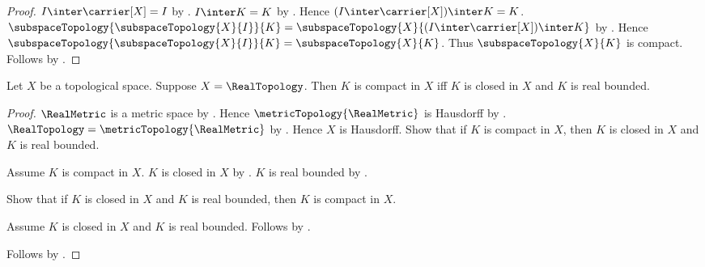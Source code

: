 \begin{proof}
    $I\inter\carrier[X]=I$ by
        .
    $I\inter K=K$ by
        .
    Hence $(I\inter\carrier[X])\inter K=K$.
    $\subspaceTopology{\subspaceTopology{X}{I}}{K}
        =\subspaceTopology{X}{(I\inter\carrier[X])\inter K}$ by
        .
    Hence $\subspaceTopology{\subspaceTopology{X}{I}}{K}
        =\subspaceTopology{X}{K}$.
    Thus $\subspaceTopology{X}{K}$ is compact.
    Follows by .
\end{proof}

\begin{theorem}\label{real_heine_borel}
    Let $X$ be a topological space.
    Suppose $X=\RealTopology$.
    Then $K$ is compact in $X$ iff
        $K$ is closed in $X$ and $K$ is real bounded.
\end{theorem}
\begin{proof}
    $\RealMetric$ is a metric space by
        .
    Hence $\metricTopology{\RealMetric}$ is Hausdorff by
        .
    $\RealTopology=\metricTopology{\RealMetric}$ by
        .
    Hence $X$ is Hausdorff.
    Show that if $K$ is compact in $X$, then
        $K$ is closed in $X$ and $K$ is real bounded.
    \begin{subproof}
        Assume $K$ is compact in $X$.
        $K$ is closed in $X$ by
            .
        $K$ is real bounded by
            .
    \end{subproof}
    Show that if $K$ is closed in $X$ and $K$ is real bounded, then
        $K$ is compact in $X$.
    \begin{subproof}
        Assume $K$ is closed in $X$ and $K$ is real bounded.
        Follows by .
    \end{subproof}
    Follows by \auto.
\end{proof}
